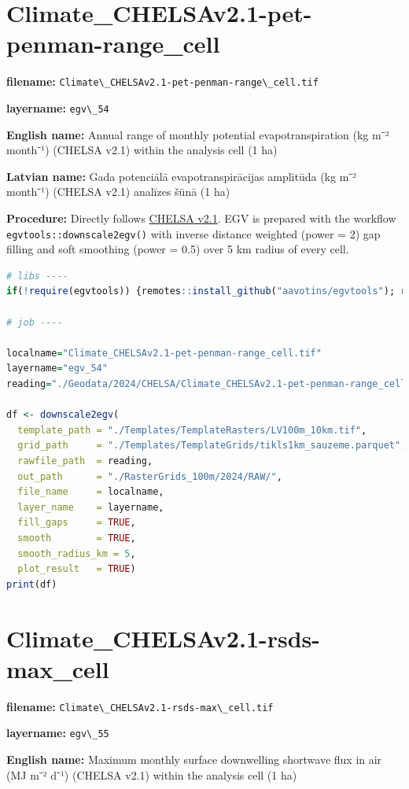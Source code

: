 \documentclass[
]{book}
\newcommand{\passthrough}[1]{#1}
\begin{document}
\section{Climate\_CHELSAv2.1-pet-penman-range\_cell}\label{ch06.054}

\textbf{filename:} \passthrough{\lstinline!Climate\_CHELSAv2.1-pet-penman-range\_cell.tif!}

\textbf{layername:} \passthrough{\lstinline!egv\_54!}

\textbf{English name:} Annual range of monthly potential evapotranspiration (kg m⁻² month⁻¹) (CHELSA v2.1) within the analysis cell (1 ha)

\textbf{Latvian name:} Gada potenciālā evapotranspirācijas amplitūda (kg m⁻² month⁻¹) (CHELSA v2.1) analīzes šūnā (1 ha)

\textbf{Procedure:} Directly follows \hyperref[Ch04.11]{CHELSA v2.1}. EGV is prepared with the
workflow \passthrough{\lstinline!egvtools::downscale2egv()!} with inverse distance weighted (power = 2)
gap filling and soft smoothing (power = 0.5) over 5 km radius of every cell.

\begin{lstlisting}[language=R]
# libs ----
if(!require(egvtools)) {remotes::install_github("aavotins/egvtools"); require(egvtools)}

# job ----

localname="Climate_CHELSAv2.1-pet-penman-range_cell.tif"
layername="egv_54"
reading="./Geodata/2024/CHELSA/Climate_CHELSAv2.1-pet-penman-range_cell.tif"

df <- downscale2egv(
  template_path = "./Templates/TemplateRasters/LV100m_10km.tif",
  grid_path     = "./Templates/TemplateGrids/tikls1km_sauzeme.parquet",
  rawfile_path  = reading,
  out_path      = "./RasterGrids_100m/2024/RAW/",
  file_name     = localname,
  layer_name    = layername,
  fill_gaps     = TRUE,
  smooth        = TRUE,
  smooth_radius_km = 5,
  plot_result   = TRUE)
print(df)
\end{lstlisting}

\section{Climate\_CHELSAv2.1-rsds-max\_cell}\label{ch06.055}

\textbf{filename:} \passthrough{\lstinline!Climate\_CHELSAv2.1-rsds-max\_cell.tif!}

\textbf{layername:} \passthrough{\lstinline!egv\_55!}

\textbf{English name:} Maximum monthly surface downwelling shortwave flux in air (MJ m⁻² d⁻¹) (CHELSA v2.1) within the analysis cell (1 ha)
\end{document}
